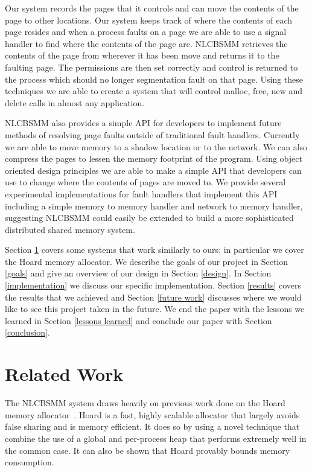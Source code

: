 \documentclass[9pt]{sig-alternate-10pt}
\begin{document}
Our system records the pages that it controls and can move the contents of the page to other locations. Our system keeps track of where the contents of each page resides and when a process faults on a page we are able to use a signal handler to find where the contents of the page are. NLCBSMM retrieves the contents of the page from wherever it has been move and returns it to the faulting page. The permissions are then set correctly and control is returned to the process which should no longer segmentation fault on that page. Using these techniques we are able to create a system that will control malloc, free, new and delete calls in almost any application. 

NLCBSMM also provides a simple API for developers to implement future methods of resolving page faults outside of traditional fault handlers. Currently we are able to move memory to a shadow location or to the network. We can also compress the pages to lessen the memory footprint of the program. Using object oriented design principles we are able to make a simple API that developers can use to change where the contents of pages are moved to. We provide several experimental implementations for fault handlers that implement this API including a simple memory to memory handler and network to memory handler, suggesting NLCBSMM could easily be extended to build a more sophisticated distributed shared memory system.

Section \ref{related work} covers some systems that work similarly to ours; in particular we cover the Hoard memory allocator. We describe the goals of our project in Section \ref{goals} and give an overview of our design in Section \ref{design}. In Section \ref{implementation} we discuss our specific implementation. Section \ref{results} covers the results that we achieved and Section \ref{future work} discusses where we would like to see this project taken in the future. We end the paper with the lessons we learned in Section \ref{lessons learned} and conclude our paper with Section \ref{conclusion}.

\section{Related Work}
\label{related work}
The NLCBSMM system draws heavily on previous work done on the Hoard memory allocator~\cite{hoard}.  Hoard is a fast, highly scalable allocator that largely avoids false sharing and is memory efficient.  It does so by using a novel technique that combine the use of a global and per-process heap that performs extremely well in the common case.  It can also be shown that Hoard provably bounds memory consumption.  
\end{document}
